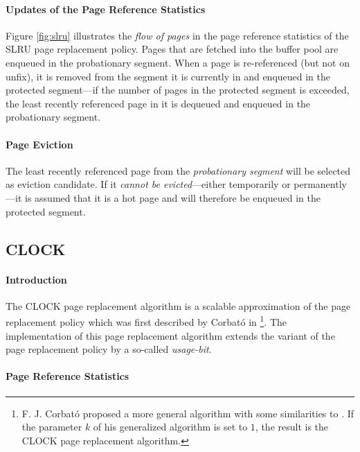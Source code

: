 \paragraph{Updates of the Page Reference Statistics}

    Figure \ref{fig:slru} illustrates the \emph{flow of pages} in the page reference statistics of the SLRU page replacement policy. Pages that are fetched into the buffer pool are enqueued in the probationary segment. When a page is re-referenced (but not on unfix), it is removed from the segment it is currently in and enqueued in the protected segment---if the number of pages in the protected segment is exceeded, the least recently referenced page in it is dequeued and enqueued in the probationary segment.

\paragraph{Page Eviction}

    The least recently referenced page from the \emph{probationary segment} will be selected as eviction candidate. If it \emph{cannot be evicted}---either temporarily or permanently---it is assumed that it is a hot page and will therefore be enqueued in the protected segment.

\subsection{CLOCK} \label{subsec:clock}

\paragraph{Introduction}

    The CLOCK page replacement algorithm is a scalable approximation of the  page replacement policy which was first described by Corbató in \cite{Corbato:1969}\footnote{F. J. Corbató proposed a more general algorithm with some similarities to . If the parameter $k$ of his generalized algorithm is set to $1$, the result is the CLOCK page replacement algorithm.}. The implementation of this page replacement algorithm extends the  variant of the  page replacement policy by a so-called \emph{usage-bit}.

\paragraph{Page Reference Statistics}

